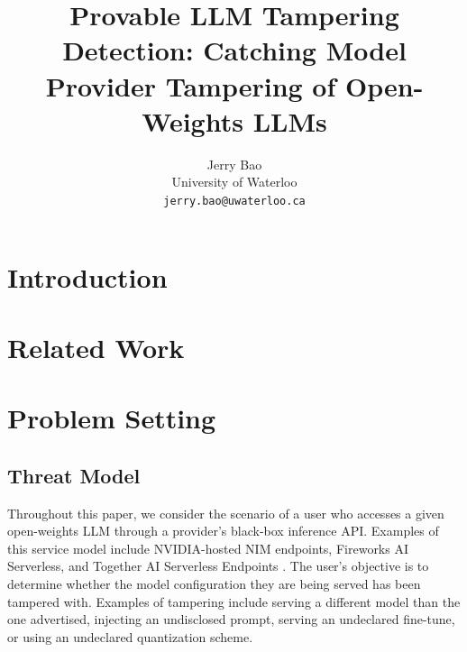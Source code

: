 \documentclass{article}
\title{Provable LLM Tampering Detection: Catching Model Provider Tampering of
Open-Weights LLMs}
\author{Jerry Bao\\University of Waterloo\\\texttt{jerry.bao@uwaterloo.ca}}
\begin{document}
\maketitle
\lhead{}

\begin{abstract}
\end{abstract}

\section{Introduction}

\section{Related Work}

\section{Problem Setting}
\subsection{Threat Model}

Throughout this paper, we consider the scenario of a user who accesses a given open-weights LLM
through a provider's black-box inference API. Examples of this service model
include NVIDIA-hosted NIM endpoints, Fireworks AI Serverless, and Together AI
Serverless Endpoints
\citep{nvidia_nim_quickstart,fireworks_serverless,together_serverless}. The user's objective is to determine whether the model configuration they are being served has been tampered with. Examples of tampering include serving a different model than the one advertised, injecting an undisclosed prompt, serving an undeclared fine-tune, or using an undeclared quantization scheme.
\end{document}
